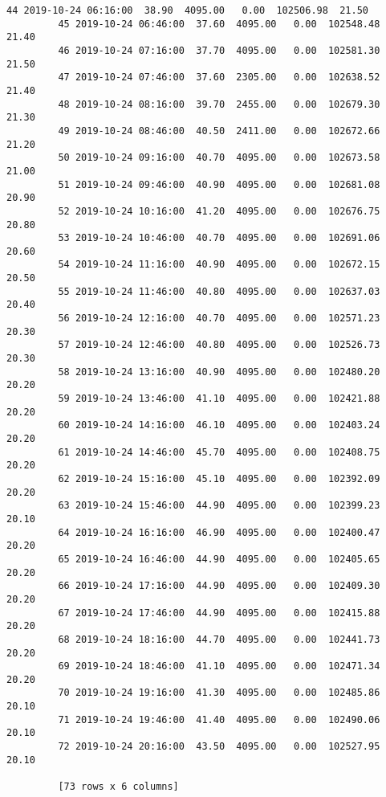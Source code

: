 \documentclass[11pt]{article}
\begin{document}
\begin{Verbatim}[commandchars=\\\{\}]
         44 2019-10-24 06:16:00  38.90  4095.00   0.00  102506.98  21.50
         45 2019-10-24 06:46:00  37.60  4095.00   0.00  102548.48  21.40
         46 2019-10-24 07:16:00  37.70  4095.00   0.00  102581.30  21.50
         47 2019-10-24 07:46:00  37.60  2305.00   0.00  102638.52  21.40
         48 2019-10-24 08:16:00  39.70  2455.00   0.00  102679.30  21.30
         49 2019-10-24 08:46:00  40.50  2411.00   0.00  102672.66  21.20
         50 2019-10-24 09:16:00  40.70  4095.00   0.00  102673.58  21.00
         51 2019-10-24 09:46:00  40.90  4095.00   0.00  102681.08  20.90
         52 2019-10-24 10:16:00  41.20  4095.00   0.00  102676.75  20.80
         53 2019-10-24 10:46:00  40.70  4095.00   0.00  102691.06  20.60
         54 2019-10-24 11:16:00  40.90  4095.00   0.00  102672.15  20.50
         55 2019-10-24 11:46:00  40.80  4095.00   0.00  102637.03  20.40
         56 2019-10-24 12:16:00  40.70  4095.00   0.00  102571.23  20.30
         57 2019-10-24 12:46:00  40.80  4095.00   0.00  102526.73  20.30
         58 2019-10-24 13:16:00  40.90  4095.00   0.00  102480.20  20.20
         59 2019-10-24 13:46:00  41.10  4095.00   0.00  102421.88  20.20
         60 2019-10-24 14:16:00  46.10  4095.00   0.00  102403.24  20.20
         61 2019-10-24 14:46:00  45.70  4095.00   0.00  102408.75  20.20
         62 2019-10-24 15:16:00  45.10  4095.00   0.00  102392.09  20.20
         63 2019-10-24 15:46:00  44.90  4095.00   0.00  102399.23  20.10
         64 2019-10-24 16:16:00  46.90  4095.00   0.00  102400.47  20.20
         65 2019-10-24 16:46:00  44.90  4095.00   0.00  102405.65  20.20
         66 2019-10-24 17:16:00  44.90  4095.00   0.00  102409.30  20.20
         67 2019-10-24 17:46:00  44.90  4095.00   0.00  102415.88  20.20
         68 2019-10-24 18:16:00  44.70  4095.00   0.00  102441.73  20.20
         69 2019-10-24 18:46:00  41.10  4095.00   0.00  102471.34  20.20
         70 2019-10-24 19:16:00  41.30  4095.00   0.00  102485.86  20.10
         71 2019-10-24 19:46:00  41.40  4095.00   0.00  102490.06  20.10
         72 2019-10-24 20:16:00  43.50  4095.00   0.00  102527.95  20.10
         
         [73 rows x 6 columns]
\end{Verbatim}
        

    
    
    
    
\end{document}

